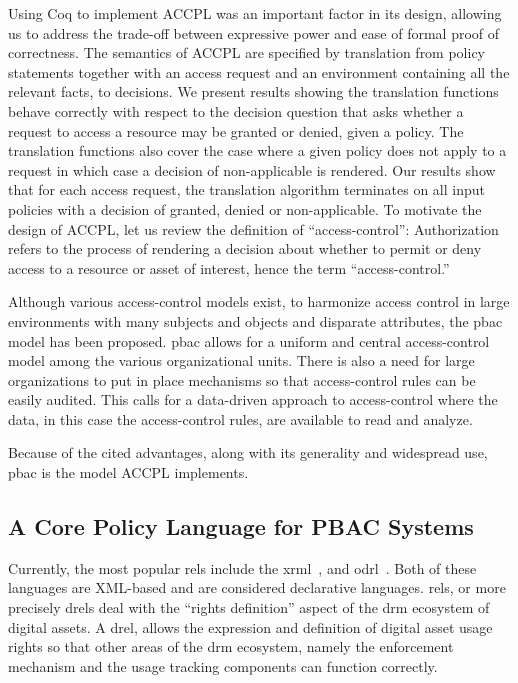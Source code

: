 \documentclass[conference]{IEEEtran}
\begin{document}
Using Coq to implement \ac{ACCPL} was an
important factor in its design, allowing us to address the trade-off
between expressive power and ease of formal proof of correctness.
The semantics of \ac{ACCPL} are specified by translation from policy
statements together with an access request and an environment
containing all the relevant facts, to decisions. We present results
showing the translation functions behave correctly with respect to the
decision question that asks whether a request to access a resource may
be granted or denied, given a policy. The translation functions also
cover the case where a given policy does not apply to a request in
which case a decision of non-applicable is rendered. Our results show
that for each access request, the translation algorithm terminates on
all input policies with a decision of granted, denied or
non-applicable.
To motivate the design of \ac{ACCPL}, let us review the definition of
``access-control'': Authorization refers to the process of rendering a
decision about whether to permit or deny access to a resource or asset
of interest, hence the term ``access-control.''

Although various access-control models exist, to harmonize access control in large environments with many subjects and objects and disparate attributes, the \ac{pbac}~\cite{nist} model has been proposed. \ac{pbac} allows for a uniform and central access-control model among the various organizational units. There is also a need for large organizations to put in place mechanisms so that access-control rules can be easily audited. This calls for a data-driven approach to access-control where the data, in this case the access-control rules, are available to read and analyze. 


Because of the cited advantages, along with its generality and
widespread use, \ac{pbac} is the model \ac{ACCPL} implements.


\subsection{A Core Policy Language for PBAC Systems} 

Currently, the most popular \ac{rel}s include the
\ac{xrml}~\cite{Wang}, and \ac{odrl}~\cite{odrloneone}. Both of these
languages are XML-based and are considered declarative
languages. \ac{rel}s, or more precisely \ac{drel}s deal with the ``rights
definition'' aspect of the \ac{drm} ecosystem of digital assets. 
A \ac{drel}, allows the expression and definition
of digital asset usage rights so that other areas of the \ac{drm}
ecosystem, namely the enforcement mechanism and the usage tracking
components can function correctly.
\end{document}
